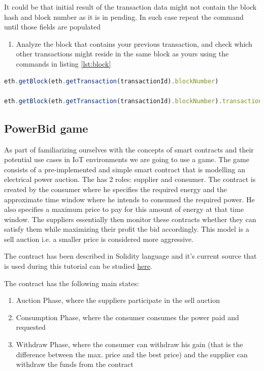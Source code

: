 \documentclass[a4paper]{article}
\begin{document}
It could be that initial result of the transaction data might not contain the block hash and block number as it is in pending. In such case repeat the  command until those fields are populated

\begin{enumerate}[label=\textbf{Task \arabic*}:,l_tasks]
\item Analyze the block that contains your previous transaction, and check which other transactions might reside in the same block as yours using the commands in listing \ref{lst:block}
\end{enumerate}

\begin{lstlisting}[language=javascript,caption={Functions for analyzing a block},label={lst:block}]
eth.getBlock(eth.getTransaction(transactionId).blockNumber)

eth.getBlock(eth.getTransaction(transactionId).blockNumber).transactions.map(function(tx){return eth.getTransaction(tx);})
\end{lstlisting}

\subsection{PowerBid game}

As part of familiarizing ourselves with the concepts of smart contracts and their potential use cases in IoT environments we are going to use a game. The game consists of a pre-implemented and simple smart contract that is modelling an electrical power auction. The has 2 roles: supplier and consumer. The contract is created by the consumer where he specifies the required energy and the approximate time window where he intends to consumed the required power. He also specifies a maximum price to pay for this amount of energy at that time window. The suppliers essentially then monitor these contracts whether they can satisfy them while maximizing their profit the bid accordingly. This model is a sell auction i.e. a smaller price is considered more aggressive. 

The contract has been described in Solidity language and it's current source that is used during this tutorial can be studied \href{https://raw.githubusercontent.com/fecjanky/iot_sc_tutorial/v1.0.4/src/powerbid.sol}{here}.

The contract has the following main states:
\begin{enumerate}
    \item Auction Phase, where the suppliers participate in the sell auction
    \item Consumption Phase, where the consumer consumes the power paid and requested
    \item Withdraw Phase, where the consumer can withdraw his gain (that is the difference between the max. price and the best price) and the supplier can withdraw the funds from the contract
\end{enumerate}
\end{document}
